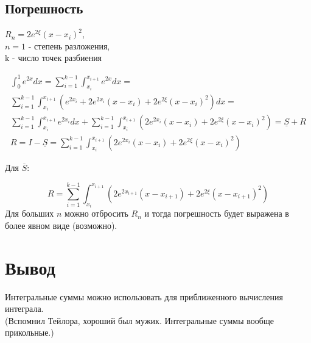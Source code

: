 \documentclass[12pt, a4paper]{article}
\begin{document}
\subsection{Погрешность}
\begin{center}
    \(R_n = 2e^{2\xi} (x-x_i)^2\), \\
    \(n = 1\) - степень разложения, \\
    k - число точек разбиения
\end{center}
\begin{equation}
    \begin{gathered}
        \int_0^1 e^{2x} dx = \sum\limits_{i=1}^{k-1}\int_{x_i}^{x_{i+1}} e^{2x} dx = \\
        \sum\limits_{i=1}^{k-1}\int_{x_i}^{x_{i+1}} (e^{2x_i} +2e^{2x_i}(x-x_i) +
        2e^{2\xi} (x-x_i)^2) dx = \\
        \sum\limits_{i=1}^{k-1}\int_{x_i}^{x_{i+1}} e^{2x_i} dx + \sum\limits_{i=1}^{k-1}\int_{x_i}^{x_{i+1}} (2e^{2x_i}(x-x_i) + 2e^{2\xi}(x-x_i)^2)=
        \underline{S} + R \\
        R = I - \underline{S} = \sum\limits_{i=1}^{k-1}\int_{x_i}^{x_{i+1}} (2e^{2x_i}(x-x_i) + 2e^{2\xi}(x-x_i)^2)
    \end{gathered}
\end{equation}
\begin{center}
    Для \(\overline{S}\):
\end{center}
\begin{equation}
    R = \sum\limits_{i=1}^{k-1}\int_{x_i}^{x_{i+1}} (2e^{2x_{i+1}}(x-x_{i+1}) + 2e^{2\xi}(x-x_{i+1})^2)
\end{equation}
Для больших \(n\) можно отбросить \(R_n\) и тогда погрешность будет выражена в более явном виде (возможно).
\section{Вывод}
Интегральные суммы можно использовать для приближенного вычисления интеграла. \\
(Вспомнил Тейлора, хороший был мужик. Интегральные суммы вообще прикольные.)
\end{document}
